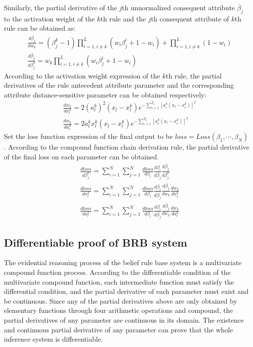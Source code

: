 \documentclass{ieeeaccess}
\begin{document}
Similarly, the partial derivative of the $j$th unnormalized consequent attribute $\overline{\beta}_j$ to the activation weight of the $k$th rule and the $j$th consequent attribute of $k$th rule can be obtained as:
\begin{align}
     & \frac{d\overline{\beta}_j}{dw_k}=(\beta_j^k-1)\prod_{i=1,i\neq k}^L(w_i\beta_j^i+1-w_i)+\prod_{i=1,i\neq k}^L(1-w_i) \\
     & \frac{d\overline{\beta}_j}{d\beta_j^k}=w_k\prod_{i=1,i\neq k}^L(w_i\beta_j^i+1-w_i)
\end{align}
According to the activation weight expression of the $k$th rule, the partial derivatives of the rule antecedent attribute parameter and the corresponding attribute distance-sensitive parameter can be obtained respectively:
\begin{align}
     & \frac{dw_k}{dx_l^k}=2(a_l^k)^2(x_l-x_l^k)e^{-\sum_{i=1}^{T_k}[a_i^k(x_i-x_i^k)]^2}  \\
     & \frac{dw_k}{da_l^k}=2a_l^kx_l^k(x_l-x_l^k)e^{-\sum_{i=1}^{T_k}[a_i^k(x_i-x_i^k)]^2}
\end{align}
Set the loss function expression of the final output to be $loss=Loss(\beta_1,\cdots,\beta_N)$.
According to the compound function chain derivation rule, the partial derivative of the final loss on each parameter can be obtained.
\begin{align}
     & \frac{dloss}{d\beta_j^k}=\sum_{i=1}^N\sum_{j=1}^N\frac{dloss}{d\beta_i}\frac{d\beta_i}{d\overline{\beta}_j}\frac{d\overline{\beta}_j}{d\beta_j^k}          \\
     & \frac{dloss}{dx_l^k}=\sum_{i=1}^N\sum_{j=1}^N\frac{dloss}{d\beta_i}\frac{d\beta_i}{d\overline{\beta}_j}\frac{d\overline{\beta}_j}{dw_k}\frac{dw_k}{dx_l^k} \\
     & \frac{dloss}{da_l^k}=\sum_{i=1}^N\sum_{j=1}^N\frac{dloss}{d\beta_i}\frac{d\beta_i}{d\overline{\beta}_j}\frac{d\overline{\beta}_j}{dw_k}\frac{dw_k}{da_l^k}
\end{align}

\subsection{Differentiable proof of BRB system}
The evidential reasoning process of the belief rule base system is a multivariate compound function process.
According to the differentiable condition of the multivariate compound function, each intermediate function must satisfy the differential condition,
and the partial derivative of each parameter must exist and be continuous.
Since any of the partial derivatives above are only obtained by elementary functions through four arithmetic operations and compound,
the partial derivatives of any parameter are continuous in its domain.
The existence and continuous partial derivative of any parameter can prove that the whole inference system is differentiable.
\end{document}
